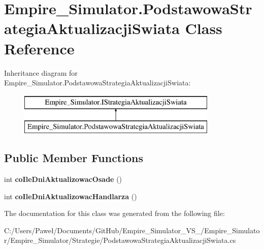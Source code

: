 \hypertarget{class_empire___simulator_1_1_podstawowa_strategia_aktualizacji_swiata}{\section{Empire\+\_\+\+Simulator.\+Podstawowa\+Strategia\+Aktualizacji\+Swiata Class Reference}
\label{class_empire___simulator_1_1_podstawowa_strategia_aktualizacji_swiata}
}
Inheritance diagram for Empire\+\_\+\+Simulator.\+Podstawowa\+Strategia\+Aktualizacji\+Swiata\+:\begin{figure}[H]
\begin{center}
\leavevmode
\includegraphics[height=2.000000cm]{class_empire___simulator_1_1_podstawowa_strategia_aktualizacji_swiata}
\end{center}
\end{figure}
\subsection*{Public Member Functions}
\begin{DoxyCompactItemize}
\item 
\hypertarget{class_empire___simulator_1_1_podstawowa_strategia_aktualizacji_swiata_a09269ca116583011493af41a63bf09c7}{int {\bfseries co\+Ile\+Dni\+Aktualizowac\+Osade} ()}\label{class_empire___simulator_1_1_podstawowa_strategia_aktualizacji_swiata_a09269ca116583011493af41a63bf09c7}

\item 
\hypertarget{class_empire___simulator_1_1_podstawowa_strategia_aktualizacji_swiata_a961720f39c96c8f938daf174eb395c02}{int {\bfseries co\+Ile\+Dni\+Aktualizowac\+Handlarza} ()}\label{class_empire___simulator_1_1_podstawowa_strategia_aktualizacji_swiata_a961720f39c96c8f938daf174eb395c02}

\end{DoxyCompactItemize}


The documentation for this class was generated from the following file\+:\begin{DoxyCompactItemize}
\item 
C\+:/\+Users/\+Paweł/\+Documents/\+Git\+Hub/\+Empire\+\_\+\+Simulator\+\_\+\+V\+S\+\_/\+Empire\+\_\+\+Simulator/\+Empire\+\_\+\+Simulator/\+Strategie/Podstawowa\+Strategia\+Aktualizacji\+Swiata.\+cs\end{DoxyCompactItemize}
